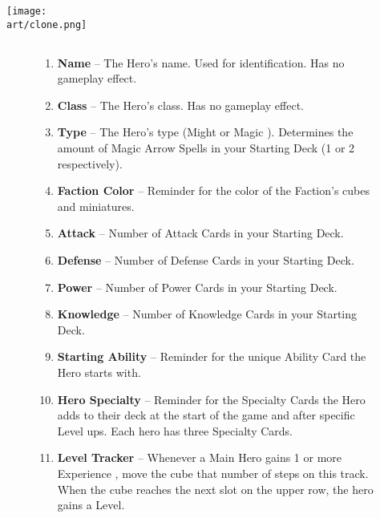 \begin{multicols*}{2}
\vfill

\hspace{2em}
\texttt{[image: \\art/clone.png]}

\end{multicols*}

\clearpage

\subsection*{}
\bigbreak
\begin{figure}[h]
  \begin{minipage}[t]{0.5\textwidth}
    \vspace{0pt}
    \begin{enumerate}[itemsep=5pt]
      \item \textbf{Name} – The Hero's name.
        Used for identification.
        Has no gameplay effect.
      \item \textbf{Class} – The Hero's class.
        Has no gameplay effect.
      \item \textbf{Type} – The Hero's type (Might  or Magic ).
        Determines the amount of Magic Arrow Spells in your Starting Deck (1 or 2 respectively).
      \item \textbf{Faction Color} – Reminder for the color of the Faction's cubes and miniatures.
      \item \textbf{Attack} – Number of Attack Cards in your Starting Deck.
      \item \textbf{Defense} – Number of Defense Cards in your Starting Deck.
      \item \textbf{Power} – Number of Power Cards in your Starting Deck.
      \item \textbf{Knowledge} – Number of Knowledge Cards in your Starting Deck.
      \item \textbf{Starting Ability} – Reminder for the unique Ability Card the Hero starts with.
      \item \textbf{Hero Specialty} – Reminder for the Specialty Cards the Hero adds to their deck at the start of the game and after specific Level ups.
        Each hero has three Specialty Cards.
      \item \textbf{Level Tracker} – Whenever a Main Hero gains 1 or more Experience , move the cube that number of steps on this track.
        When the cube reaches the next slot on the upper row, the hero gains a Level.

\end{enumerate}
\end{minipage}
\end{figure}
